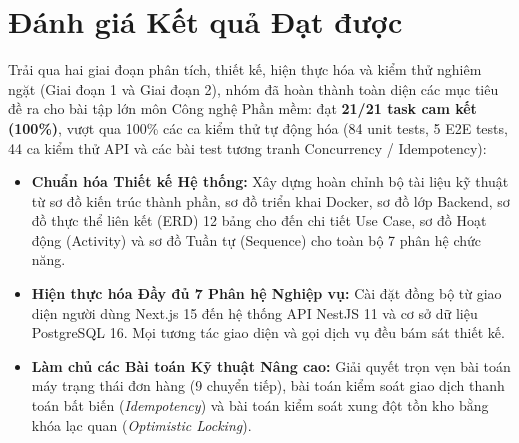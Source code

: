 \documentclass[12pt,a4paper,oneside]{report}
\begin{document}
\section{Đánh giá Kết quả Đạt được}
Trải qua hai giai đoạn phân tích, thiết kế, hiện thực hóa và kiểm thử nghiêm ngặt (Giai đoạn 1 và Giai đoạn 2), nhóm đã hoàn thành toàn diện các mục tiêu đề ra cho bài tập lớn môn Công nghệ Phần mềm: đạt \textbf{21/21 task cam kết (100\%)}, vượt qua 100\% các ca kiểm thử tự động hóa (84 unit tests, 5 E2E tests, 44 ca kiểm thử API và các bài test tương tranh Concurrency / Idempotency):
\begin{itemize}
    \item \textbf{Chuẩn hóa Thiết kế Hệ thống:} Xây dựng hoàn chỉnh bộ tài liệu kỹ thuật từ sơ đồ kiến trúc thành phần, sơ đồ triển khai Docker, sơ đồ lớp Backend, sơ đồ thực thể liên kết (ERD) 12 bảng cho đến chi tiết Use Case, sơ đồ Hoạt động (Activity) và sơ đồ Tuần tự (Sequence) cho toàn bộ 7 phân hệ chức năng.
    \item \textbf{Hiện thực hóa Đầy đủ 7 Phân hệ Nghiệp vụ:} Cài đặt đồng bộ từ giao diện người dùng Next.js 15 đến hệ thống API NestJS 11 và cơ sở dữ liệu PostgreSQL 16. Mọi tương tác giao diện và gọi dịch vụ đều bám sát thiết kế.
    \item \textbf{Làm chủ các Bài toán Kỹ thuật Nâng cao:} Giải quyết trọn vẹn bài toán máy trạng thái đơn hàng (9 chuyển tiếp), bài toán kiểm soát giao dịch thanh toán bất biến (\textit{Idempotency}) và bài toán kiểm soát xung đột tồn kho bằng khóa lạc quan (\textit{Optimistic Locking}).
\end{itemize}
\end{document}

